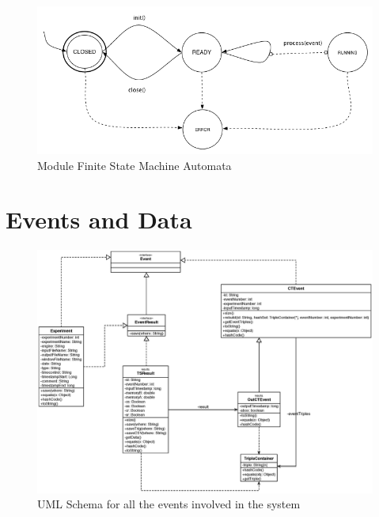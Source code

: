\begin{figure}[tbh]
  \centering
	\includegraphics[width=\linewidth]{images/fsm-schema}
	\caption{Module Finite State Machine Automata} 
  	\label{fig:module-fsm}
\end{figure}


\section{Events and Data}\label{sec:data-impl}

\begin{figure}[tbh]
  \centering
	\includegraphics[width=\linewidth]{images/uml_events}
	\caption{UML Schema for all the events involved in the system} 
  	\label{fig:module-fsm}
\end{figure}

